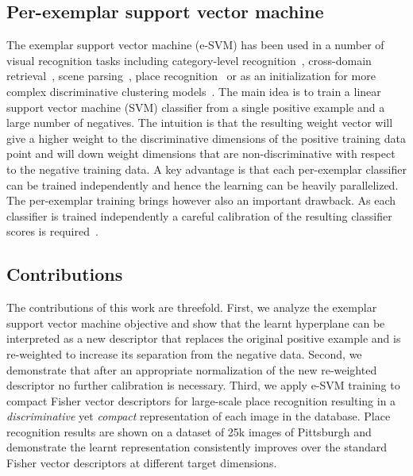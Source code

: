 \documentclass[10pt,twocolumn,letterpaper]{article}
\begin{document}
\subsection*{Per-exemplar support vector machine} %
    The exemplar support vector machine (e-SVM) has been used in a number of visual recognition tasks including category-level recognition~\cite{Malisiewicz11}, cross-domain retrieval~\cite{Shrivastava11}, scene parsing~\cite{Tighe13}, place recognition~\cite{Gronat13} or as an initialization  for more complex discriminative clustering models~\cite{Doersch12,Singh12}. The main idea is to train a linear support vector machine (SVM) classifier from a single positive example and a large number of negatives. The intuition is that the resulting weight vector will give a higher weight to the discriminative dimensions of the positive training data point and will down weight dimensions that are non-discriminative with respect to the negative training data. A key advantage is that each per-exemplar classifier can be trained independently and hence the learning can be heavily parallelized. The per-exemplar training brings however also an important drawback. As each classifier is trained independently a careful calibration of the resulting classifier scores is required~\cite{Gronat13,Malisiewicz11}. 

\subsection*{Contributions} %
    The contributions of this work are threefold.
    First, we analyze the exemplar support vector machine objective and show that the learnt hyperplane can be interpreted as a new descriptor that replaces the original positive example and is re-weighted to increase its separation from the negative data. Second, we demonstrate that after an appropriate normalization of the new re-weighted descriptor no further calibration is necessary. Third, we apply e-SVM training to compact Fisher vector descriptors for large-scale place recognition resulting in a {\em discriminative} yet {\em compact} representation of each image in the database. Place recognition results are shown on a dataset of 25k images of Pittsburgh and demonstrate the learnt representation consistently improves over the standard Fisher vector descriptors at different target dimensions.
\end{document}
